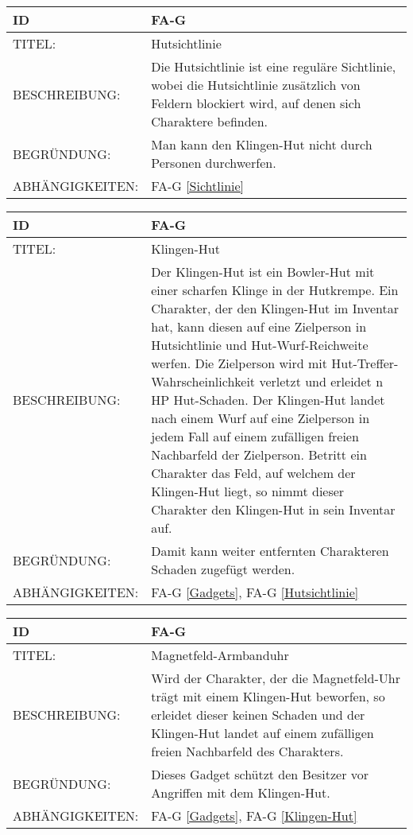 \begin{tabularx}{16cm}{l|X}
	{table}\label{Hutsichtlinie}
	\textbf{ID} & \textbf{FA-G \arabic{table}} \\
	\hline
	TITEL: & Hutsichtlinie \\
	\hline
	BESCHREIBUNG: & Die Hutsichtlinie ist eine reguläre Sichtlinie, wobei die Hutsichtlinie zusätzlich von Feldern blockiert wird, auf denen sich Charaktere befinden. \\
	\hline
	BEGRÜNDUNG: &  Man kann den Klingen-Hut nicht durch Personen durchwerfen. \\
	\hline
	ABHÄNGIGKEITEN: & FA-G \ref{Sichtlinie} \\
\end{tabularx}

\begin{tabularx}{16cm}{l|X}
	{table}\label{Klingen-Hut}
	\textbf{ID} & \textbf{FA-G \arabic{table}} \\
	\hline
	TITEL: & Klingen-Hut \\
	\hline
	BESCHREIBUNG: & Der Klingen-Hut ist ein Bowler-Hut mit einer scharfen Klinge in der Hutkrempe. Ein Charakter, der den Klingen-Hut im Inventar hat, kann diesen auf eine Zielperson in Hutsichtlinie und Hut-Wurf-Reichweite werfen. Die Zielperson wird mit Hut-Treffer-Wahrscheinlichkeit verletzt und erleidet n HP Hut-Schaden. Der Klingen-Hut landet nach einem Wurf auf eine Zielperson in jedem Fall auf einem zufälligen freien Nachbarfeld der Zielperson. Betritt ein Charakter das Feld, auf welchem der Klingen-Hut liegt, so nimmt dieser Charakter den Klingen-Hut in sein Inventar auf. \\
	\hline
	BEGRÜNDUNG: &  Damit kann weiter entfernten Charakteren Schaden zugefügt werden. \\
	\hline
	ABHÄNGIGKEITEN: & FA-G \ref{Gadgets}, FA-G \ref{Hutsichtlinie} \\
\end{tabularx}

\begin{tabularx}{16cm}{l|X}
	{table}\label{Magnetfeld-Armbanduhr}
	\textbf{ID} & \textbf{FA-G \arabic{table}} \\
	\hline
	TITEL: & Magnetfeld-Armbanduhr \\
	\hline
	BESCHREIBUNG: & Wird der Charakter, der die Magnetfeld-Uhr trägt mit einem Klingen-Hut beworfen, so erleidet dieser keinen Schaden und der Klingen-Hut landet auf einem zufälligen freien Nachbarfeld des Charakters. \\
	\hline
	BEGRÜNDUNG: &  Dieses Gadget schützt den Besitzer vor Angriffen mit dem Klingen-Hut. \\
	\hline
	ABHÄNGIGKEITEN: & FA-G \ref{Gadgets}, FA-G \ref{Klingen-Hut} \\
\end{tabularx}

